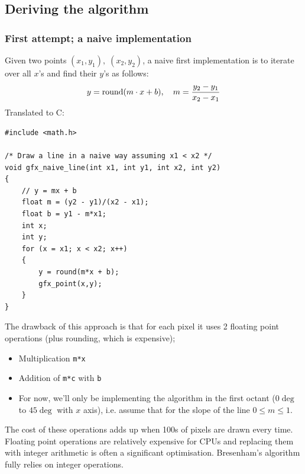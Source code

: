 \documentclass[a4paper]{article}
\begin{document}
\subsection{Deriving the algorithm}
\subsubsection{First attempt; a naive implementation}

Given two points $(x_1,y_1), \; (x_2,y_2)$, a naive first implementation is to iterate over all $x$'s and find their $y$'s as follows:
\begin{equation}
	y = \textup{round}(m\cdot x + b), \quad m = \frac{y_2 - y_1}{x_2 - x_1} 
\end{equation}
Translated to C:
\begin{verbatim}
#include <math.h>

/* Draw a line in a naive way assuming x1 < x2 */
void gfx_naive_line(int x1, int y1, int x2, int y2)
{
    // y = mx + b
    float m = (y2 - y1)/(x2 - x1);
    float b = y1 - m*x1; 
    int x;
    int y;
    for (x = x1; x < x2; x++)
    {
        y = round(m*x + b);
        gfx_point(x,y);
    }
}
\end{verbatim}
The drawback of this approach is that for each pixel it uses 2 floating point operations (plus rounding, which is expensive);
\begin{itemize}
	\item Multiplication \texttt{m*x}
	\item Addition of \texttt{m*c} with \texttt{b}
	\item For now, we'll only be implementing the algorithm in the first octant ($0\deg$ to $45\deg$ with $x$ axis), i.e. assume that for the slope of the line $0 \leq m \leq 1$.
\end{itemize}
The cost of these operations adds up when 100s of pixels are drawn every time. Floating point operations are relatively expensive for CPUs and replacing them with integer arithmetic is often a significant optimisation. Bresenham's algorithm fully relies on integer operations.
\end{document}
